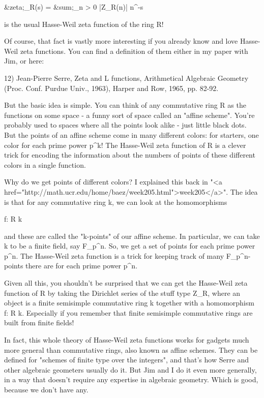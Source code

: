 &zeta;_{R}(s) = &sum;_{n > 0} |Z_{R}(n)|
n^{-s}

is the usual Hasse-Weil zeta function of the ring R!  

Of course, that fact is vastly more interesting if you already know
and love Hasse-Weil zeta functions.  You can find a definition of them
either in my paper with Jim, or here:

12) Jean-Pierre Serre, Zeta and L functions, Arithmetical Algebraic
Geometry (Proc. Conf. Purdue Univ., 1963), Harper and Row, 1965,
pp. 82-92.


But the basic idea is simple.  You can think of any commutative ring R
as the functions on some space - a funny sort of space called an
"affine scheme".  You're probably used to spaces where all the points
look alike - just little black dots.  But the points of an affine
scheme come in many different colors: for starters, one color for 
each prime power p^{k}!  The Hasse-Weil zeta function of R
is a clever trick for encoding the information about the numbers of
points of these different colors in a single function.

Why do we get points of different colors?  I explained this back in "<a
href="http://math.ucr.edu/home/baez/week205.html">week205</a>".  
The idea is that for any commutative ring k, we can look at the 
homomorphisms

f: R \to  k

and these are called the "k-points" of our affine scheme.  In
particular, we can take k to be a finite field, say
F_{p^{n}}.  So, we get a set of points for each prime
power p^{n}.  The Hasse-Weil zeta function is a trick for
keeping track of many F_{p^{n}}-points there are for
each prime power p^{n}.

Given all this, you shouldn't be surprised that we can get the
Hasse-Weil zeta function of R by taking the Dirichlet series of the
stuff type Z_{R}, where an object is a finite semisimple
commutative ring k together with a homomorphism f: R \to  k.
Especially if you remember that finite semisimple commutative rings
are built from finite fields!

In fact, this whole theory of Hasse-Weil zeta functions works for
gadgets much more general than commutative rings, also known as affine
schemes.  They can be defined for "schemes of finite type over the
integers", and that's how Serre and other algebraic geometers usually
do it.  But Jim and I do it even more generally, in a way that doesn't
require any expertise in algebraic geometry.   Which is good, because
we don't have any.

